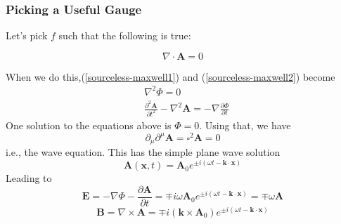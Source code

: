 
\subsubsection{Picking a Useful Gauge}
Let's pick $f$ such that the following  is true:
\begin{qt}
    \begin{equation}
\nabla \cdot \mathbf{A}=0
\label{coulomb-gauge}
\end{equation}
\end{qt}
When we do this,(\ref{sourceless-maxwell1}) and (\ref{sourceless-maxwell2}) become
\begin{equation}
\begin{aligned}
&\nabla^{2} \Phi=0\\
&\frac{\partial^{2} \mathbf{A}}{\partial t^{2}}-\nabla^{2} \mathbf{A}=-\nabla \frac{\partial \Phi}{\partial t}
\end{aligned}
\end{equation}
One solution to the equations above is $\Phi=0$. Using that, we have
\begin{equation}
\partial_{\mu} \partial^{\mu} \mathbf{A}=\square^{2} \mathbf{A}=0
\end{equation}
i.e., the wave equation. This has the simple plane wave solution
\begin{equation}
\mathbf{A}(\mathbf{x}, t)=\mathbf{A}_{0} e^{\pm i(\omega t-\mathbf{k} \cdot \mathbf{x})}
\end{equation}
Leading to
\begin{equation}
\mathbf{E}=-{\nabla \Phi}-\frac{\partial \mathbf{A}}{\partial t}=\mp i \omega \mathbf{A}_{0} e^{\pm i(\omega t-\mathbf{k} \cdot \mathbf{x})}=\mp\omega\mathbf{A}
\end{equation}
\textbf{}
\begin{equation}
\mathbf{B}=\nabla \times \mathbf{A}=\mp i\left(\mathbf{k} \times \mathbf{A}_{0}\right) e^{\pm i(\omega t-\mathbf{k} \cdot \mathbf{x})}
\end{equation}
\textbf{}

